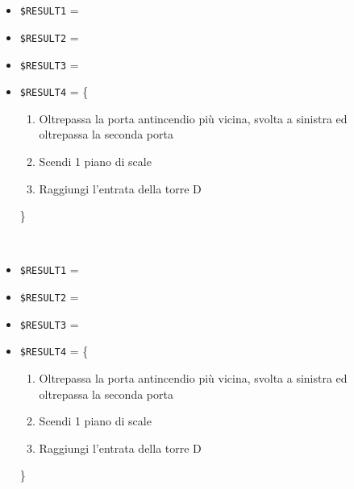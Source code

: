 \documentclass[../../Sperimentazione.tex]{subfiles}
\begin{document}
\begin{tcolorbox}[fonttitle=\bfseries, 
								adjusted title={\Large Prova 11A.1}, 
								breakable, 
								sharp corners=south,
								colback=white, 
								colframe=white!60!black]
\begin{description}[leftmargin=0.7cm,labelwidth=!]
        			\item[Output riscontrato] \ \par
        				\begin{description}
        				
        					\item[\dispositivoA] \ \par
        					\begin{itemize}
        						\item \verb|$RESULT1| = \ns
        						\item \verb|$RESULT2| = \ns
        						\item \verb|$RESULT3| = \ns
        						\item \verb|$RESULT4| = \{
        								\begin{enumerate}
        									\item Oltrepassa la porta antincendio più vicina, svolta a sinistra ed oltrepassa la seconda porta
        									\item Scendi 1 piano di scale
        									\item Raggiungi l'entrata della torre D
        								\end{enumerate}
        							\}
        					\end{itemize}      					
        					
        					\item[\dispositivoB] \ \par
        					\begin{itemize}
        						\item \verb|$RESULT1| = \ns
        						\item \verb|$RESULT2| = \ns
        						\item \verb|$RESULT3| = \ns
        						\item \verb|$RESULT4| = \{
        								\begin{enumerate}
        									\item Oltrepassa la porta antincendio più vicina, svolta a sinistra ed oltrepassa la seconda porta
        									\item Scendi 1 piano di scale
        									\item Raggiungi l'entrata della torre D
        								\end{enumerate}
        							\}
        					\end{itemize}
        					
        				\end{description}
        				

\end{description}
\end{tcolorbox}
\end{document}
